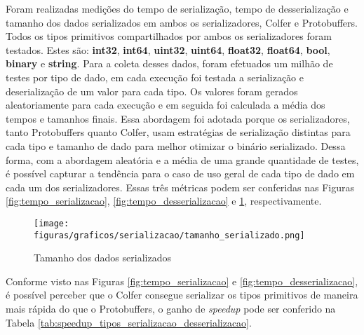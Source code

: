Foram realizadas medições do tempo de serialização, tempo de desserialização e tamanho dos dados serializados em ambos os serializadores, Colfer e Protobuffers. Todos os tipos primitivos compartilhados por ambos os serializadores foram testados. Estes são: \textbf{int32}, \textbf{int64}, \textbf{uint32}, \textbf{uint64}, \textbf{float32}, \textbf{float64}, \textbf{bool}, \textbf{binary} e \textbf{string}. Para a coleta desses dados, foram efetuados um milhão de testes por tipo de dado, em cada execução foi testada a serialização e deserialização de um valor para cada tipo. Os valores foram gerados aleatoriamente para cada execução e em seguida foi calculada a média dos tempos e tamanhos finais. Essa abordagem foi adotada porque os serializadores, tanto Protobuffers quanto Colfer, usam estratégias de serialização distintas para cada tipo e tamanho de dado para melhor otimizar o binário serializado. Dessa forma, com a abordagem aleatória e a média de uma grande quantidade de testes, é possível capturar a tendência para o caso de uso geral de cada tipo de dado em cada um dos serializadores. Essas três métricas podem ser conferidas nas Figuras \ref{fig:tempo_serializacao}, \ref{fig:tempo_desserializacao} e \ref{fig:tamanho_serializado}, respectivamente.

\begin{figure}[ht]
    \centering
    \caption{Tamanho dos dados serializados}
    \texttt{[image: figuras/graficos/serializacao/tamanho\_serializado.png]} 
    \label{fig:tamanho_serializado}
\end{figure}

Conforme visto nas Figuras \ref{fig:tempo_serializacao} e \ref{fig:tempo_desserializacao}, é possível perceber que o Colfer consegue serializar os tipos primitivos de maneira mais rápida do que o Protobuffers, o ganho de \textit{speedup} pode ser conferido na Tabela \ref{tab:speedup_tipos_serializacao_desserializacao}.

